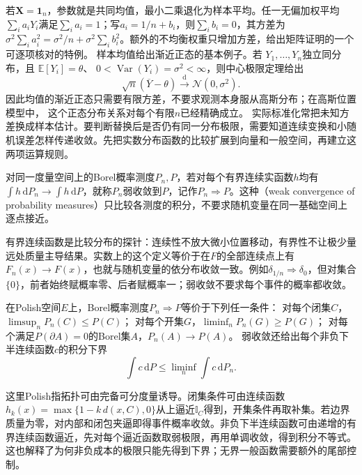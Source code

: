 若\(\bm X=\bm1_n\)，参数就是共同均值，最小二乘退化为样本平均。任一无偏加权平均\(\sum_i a_iY_i\)满足\(\sum_i a_i=1\)；写\(a_i=1/n+b_i\)，则\(\sum_i b_i=0\)，其方差为
\(\sigma^2\sum_i a_i^2=\sigma^2/n+\sigma^2\sum_i b_i^2\)。额外的不均衡权重只增加方差，给出矩阵证明的一个可逐项核对的特例。
样本均值给出渐近正态的基本例子。若
\(Y_1,\ldots,Y_n\)独立同分布，且
\(\mathbb{E}[Y_i]=\theta\)、
\(0<\operatorname{Var}(Y_i)=\sigma^2<\infty\)，则中心极限定理给出
\[
  \sqrt n(\overline Y-\theta)
  \xrightarrow{\mathrm d}\mathcal N(0,\sigma^2).
\]
因此均值的渐近正态只需要有限方差，不要求观测本身服从高斯分布；在高斯位置模型中，
这个正态分布关系对每个有限\(n\)已经精确成立。
实际标准化常把未知方差换成样本估计。要判断替换后是否仍有同一分布极限，需要知道连续变换和小随机误差怎样传递收敛。先把实数分布函数的比较扩展到向量和一般空间，再建立这两项运算规则。

\begin{definition}[概率测度的弱收敛]
\label{def:information-weak-measure-convergence}
对同一度量空间上的Borel概率测度\(P_n,P\)，若对每个有界连续实函数\(h\)均有
\(\int h\,\mathrm dP_n\to\int h\,\mathrm dP\)，就称\(P_n\)弱收敛到\(P\)，记作\(P_n\Rightarrow P\)。这种（weak convergence of probability measures）只比较各测度的积分，不要求随机变量在同一基础空间上逐点接近。
\end{definition}
有界连续函数是比较分布的探针：连续性不放大微小位置移动，有界性不让极少量远处质量主导结果。实数上的这个定义等价于在\(F\)的全部连续点上有\(F_n(x)\to F(x)\)，也就与随机变量的依分布收敛一致。例如\(\delta_{1/n}\Rightarrow\delta_0\)，但对集合\(\{0\}\)，前者始终赋概率零、后者赋概率一；弱收敛不要求每个事件的概率都收敛。

\begin{theorem}[Portmanteau的常用形式]
\label{thm:rv-portmanteau}
在Polish空间\(E\)上，Borel概率测度\(P_n\Rightarrow P\)等价于下列任一条件：
对每个闭集\(C\)，\(\limsup_nP_n(C)\leq P(C)\)；
对每个开集\(G\)，\(\liminf_nP_n(G)\geq P(G)\)；
对每个满足\(P(\partial A)=0\)的Borel集\(A\)，\(P_n(A)\to P(A)\)。
弱收敛还给出每个非负下半连续函数\(c\)的积分下界
\[
\int c\,\mathrm dP\leq\liminf_n\int c\,\mathrm dP_n.
\]
\end{theorem}
这里Polish指拓扑可由完备可分度量诱导。闭集条件可由连续函数
\(h_k(x)=\max\{1-k\,d(x,C),0\}\)从上逼近\(\mathbb I_C\)得到，开集条件再取补集。若边界质量为零，对内部和闭包夹逼即得事件概率收敛。非负下半连续函数可由递增的有界连续函数逼近，先对每个逼近函数取弱极限，再用单调收敛，得到积分不等式。这也解释了为何非负成本的极限只能先得到下界；无界一般函数需要额外的尾部控制。

